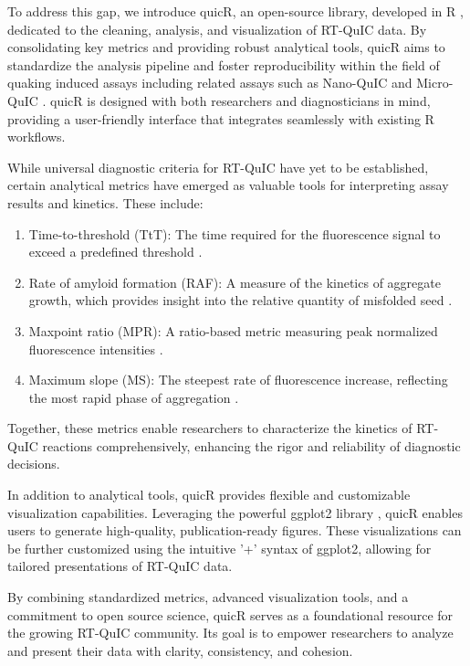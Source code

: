 \documentclass[preprint,12pt, a4paper]{elsarticle}
\begin{document}
    To address this gap, we introduce quicR, an open-source library, developed in R \cite{R2024}, dedicated to the cleaning, analysis, and visualization of RT-QuIC data. By consolidating key metrics and providing robust analytical tools, quicR aims to standardize the analysis pipeline and foster reproducibility within the field of quaking induced assays including related assays such as Nano-QuIC \cite{Christenson2023} and Micro-QuIC \cite{Lee2024}. quicR is designed with both researchers and diagnosticians in mind, providing a user-friendly interface that integrates seamlessly with existing R workflows.

    While universal diagnostic criteria for RT-QuIC have yet to be established, certain analytical metrics have emerged as valuable tools for interpreting assay results and kinetics. These include:

    \begin{enumerate}
        \item Time-to-threshold (TtT): The time required for the fluorescence signal to exceed a predefined threshold \cite{Orru2015}.
        \item Rate of amyloid formation (RAF): A measure of the kinetics of aggregate growth, which provides insight into the relative quantity of misfolded seed \cite{Gallups2022}.
        \item Maxpoint ratio (MPR): A ratio-based metric measuring peak normalized fluorescence intensities \cite{Rowden2023}.
        \item Maximum slope (MS): The steepest rate of fluorescence increase, reflecting the most rapid phase of aggregation \cite{Henderson2015}.
    \end{enumerate}

    Together, these metrics enable researchers to characterize the kinetics of RT-QuIC reactions comprehensively, enhancing the rigor and reliability of diagnostic decisions.

    In addition to analytical tools, quicR provides flexible and customizable visualization capabilities. Leveraging the powerful ggplot2 library \cite{ggplot2016}, quicR enables users to generate high-quality, publication-ready figures. These visualizations can be further customized using the intuitive '+' syntax of ggplot2, allowing for tailored presentations of RT-QuIC data.

    By combining standardized metrics, advanced visualization tools, and a commitment to open source science, quicR serves as a foundational resource for the growing RT-QuIC community. Its goal is to empower researchers to analyze and present their data with clarity, consistency, and cohesion.
\end{document}
